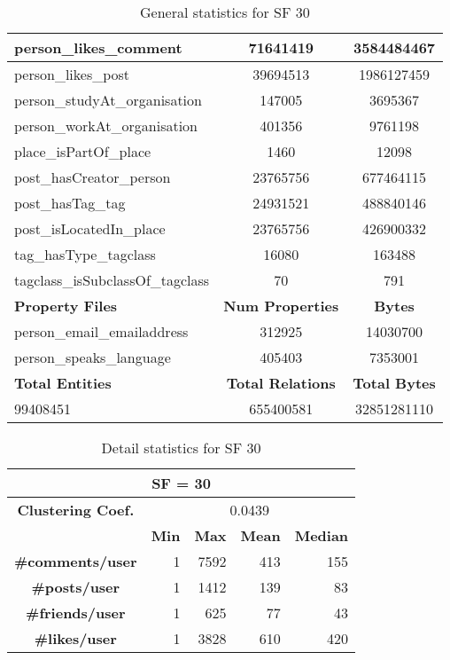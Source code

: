 \begin{table}[H]
\begin{tabular} {| l | c | c |}
        \hline
        person\_likes\_comment & 71641419 & 3584484467 \\
        \hline
        person\_likes\_post & 39694513 & 1986127459 \\
        \hline
        person\_studyAt\_organisation & 147005 & 3695367 \\
        \hline
        person\_workAt\_organisation & 401356 & 9761198 \\
        \hline
        place\_isPartOf\_place & 1460 & 12098 \\
        \hline
        post\_hasCreator\_person & 23765756 & 677464115 \\
        \hline
        post\_hasTag\_tag & 24931521 & 488840146 \\
        \hline
        post\_isLocatedIn\_place & 23765756 & 426900332 \\
        \hline
        tag\_hasType\_tagclass & 16080 & 163488 \\
        \hline
        tagclass\_isSubclassOf\_tagclass & 70 & 791 \\
        \hline
        \hline
        \textbf{Property Files} & \textbf{Num Properties} & \textbf{Bytes} \\
        \hline
        \hline
        person\_email\_emailaddress & 312925 & 14030700 \\
        \hline
        person\_speaks\_language & 405403 & 7353001 \\
        \hline
        \hline
        \textbf{Total Entities} & \textbf{Total Relations} & \textbf{Total Bytes} \\
        \hline
        \hline
         99408451 & 655400581 & 32851281110 \\
        \hline
    \end{tabular}
    \caption{General statistics for SF 30}
\end{table}

\begin{table}[H]
    \centering
\begin{tabular}{|c||r|r|r|r|}
\hline    \multicolumn{5}{|c|}{SF = 30 }  \\
\hline   \textbf{Clustering Coef.} &   \multicolumn{4}{|c|}{0.0439} \\
                            \hline & \textbf{Min} & \textbf{Max} & \textbf{Mean} & \textbf{Median}   \\
 \hline  \textbf{\#comments/user}  &1 &  7592 & 413 & 155 \\
    \hline  \textbf{\#posts/user}  &1 &  1412 & 139 & 83 \\
  \hline  \textbf{\#friends/user}  &1 &  625 & 77 & 43 \\
    \hline  \textbf{\#likes/user}  &1 &  3828 & 610 & 420 \\
\hline
\end{tabular}
\caption{Detail statistics for SF 30}
\end{table}


